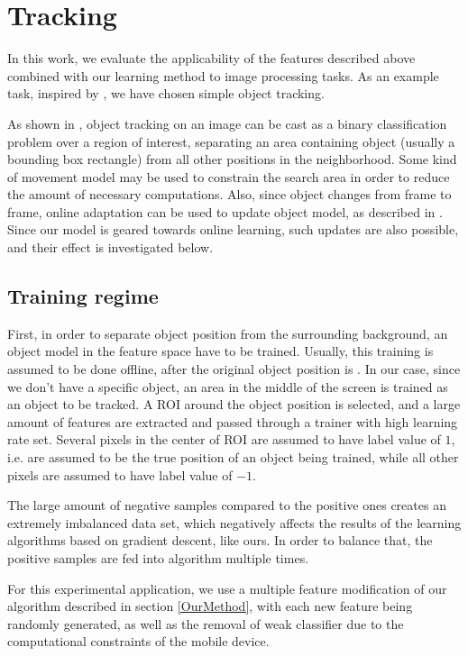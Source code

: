 \section{Tracking}
In this work, we evaluate the applicability of the features described above combined with our learning method to image processing tasks. As an example task, inspired by \cite{OnlineBoost}, we have chosen simple object tracking. 

As shown in \cite{avidan}, object tracking on an image can be cast as a binary classification problem over a region of interest, separating an area containing object (usually a bounding box rectangle) from all other positions in the neighborhood. Some kind of movement model may be used to constrain the search area in order to reduce the amount of necessary computations. Also, since object changes from frame to frame, online adaptation can be used to update object model, as described in \cite{OnlineBoost}. Since our model is geared towards online learning, such updates are also possible, and their effect is investigated below.
\subsection{Training regime}
First, in order to separate object position from the surrounding background, an object model in the feature space have to be trained. Usually, this training is assumed to be done offline, after the original object position is . In our case, since we don't have a specific object, an area in the middle of the screen is trained as an object to be tracked. A ROI around the object position is selected, and a large amount of features are extracted and passed through a trainer with high learning rate set. Several pixels in the center of ROI are assumed to have label value of $1$, i.e. are assumed to be the true position of an object being trained, while all other pixels are assumed to have label value of $-1$. 

The large amount of negative samples compared to the positive ones creates an extremely imbalanced data set, which negatively affects the results of the learning algorithms based on gradient descent, like ours. In order to balance that, the positive samples are fed into algorithm multiple times. 

For this experimental application, we use a multiple feature modification of our algorithm described in section \ref{OurMethod}, with each new feature being randomly generated, as well as the removal of weak classifier due to the computational constraints of the mobile device.

